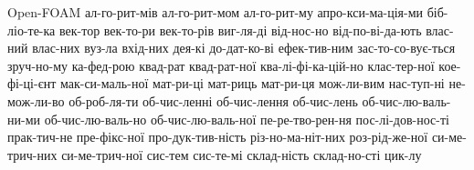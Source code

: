 
\hyphenation
{
  Open-FOAM
  ал-го-рит-мів
  ал-го-рит-мом
  ал-го-рит-му
  апро-кси-ма-ція-ми
  біб-ліо-те-ка
  век-тор
  век-то-ри
  век-то-рів
  виг-ля-ді
  від-нос-но
  від-по-ві-да-ють
  влас-ний
  влас-них
  вуз-ла
  вхід-них
  дея-кі
  до-дат-ко-ві
  ефек-тив-ним
  зас-то-со-вує-ться
  зруч-но-му
  ка-фед-рою
  квад-рат
  квад-рат-ної
  ква-лі-фі-ка-цій-но
  клас-тер-ної
  кое-фі-ці-єнт
  мак-си-маль-ної
  мат-ри-ці
  мат-риць
  мат-ри-ця
  мож-ли-вим
  нас-туп-ні
  не-мож-ли-во
  об-роб-ля-ти
  об-чис-ленні
  об-чис-лення
  об-чис-лень
  об-чис-лю-валь-ни-ми
  об-чис-лю-валь-но
  об-чис-лю-валь-ної
  пе-ре-тво-рен-ня
  пос-лі-дов-нос-ті
  прак-тич-не
  пре-фікс-ної
  про-дук-тив-ність
  різ-но-ма-ніт-них
  роз-рід-же-ної
  си-ме-трич-них
  си-ме-трич-ної
  сис-тем
  сис-те-мі
  склад-ність
  склад-но-сті
  цик-лу
}



\ESKDsetPadding{10mm}{10mm}

\makeatletter
\renewcommand{\l@section}{\@dottedtocline{0}{1.5em}{2.3em}}
\renewcommand{\l@subsection}{\@dottedtocline{1}{2.5em}{2.3em}}
\renewcommand{\l@subsubsection}{\@dottedtocline{2}{3.5em}{2.3em}}
\makeatother

\newcommand{\docseparator}[1]{
  \newpage
  \thispagestyle{empty}
  \ESKDthisStyle{empty}
  \noindent\parbox[c][\vsize][c]{\hsize}
  {\centering\fontsize{36pt}{40pt}\selectfont#1}

  \setcounter{page}{0}
  \setcounter{section}{0}
  \setcounter{subsection}{0}
  \setcounter{subsubsection}{0}
}

\newcommand{\apptitletop}[1]{%
ДОДАТОК #1\par
Алгоритм динамічної маршрутизації мультікастової розсилки}

\newcommand{\apptitlepages}[1]{%
Аркушів \pageref{LastPage}\par}

\newcommand{\appendixtitle}[3]{
  \newpage
  \thispagestyle{empty}
  \ESKDthisStyle{empty}
  \noindent
  \parbox[t][0.15\vsize][t]{\hsize}
  {\centering\large\apptitletop{#1}}
  \parbox[t][0.4\vsize][c]{\hsize}
  {\centering\Large\textbf{#2}\par#3}
  \parbox[t][0.20\vsize][c]{\hsize}{~~}
  \parbox[t][0.08\vsize][t]{\hsize}
  {\centering\apptitlepages}
  \vfill
  \noindent\parbox[c]{\hsize}{\centering\titlebottom}

  \setcounter{page}{0}
  \setcounter{section}{0}
  \setcounter{subsection}{0}
  \setcounter{subsubsection}{0}
}

